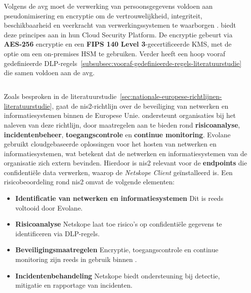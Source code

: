 Volgens de \gls{avg} moet de verwerking van persoonsgegevens voldoen aan pseudonimisering en encryptie om de vertrouwelijkheid, 
integriteit, beschikbaarheid en veerkracht van verwerkingssystemen te waarborgen \autocite{ICSA2018}.
\textcite{Netskope2025Encryption, Netskope2022Encryption} biedt deze principes aan in hun Cloud Security Platform.
De encryptie gebeurt via \textbf{AES-256} encryptie en een \textbf{FIPS 140 Level 3}-gecertificeerde KMS, met de optie om een on-premises HSM te gebruiken.
Verder heeft \textcite{Netskope2023GDPR} een hoop vooraf gedefinieerde DLP-regels~\ref{subsubsec:vooraf-gedefinieerde-regels-literatuurstudie} die samen voldoen aan de \gls{avg}.



\subsection{}
\label{sec:nis2_richtlijn}
Zoals besproken in de literatuurstudie~\ref{sec:nationale-europese-richtlijnen-literatuurstudie}, 
gaat de \gls{nis2}-richtlijn over de beveiliging van netwerken en informatiesystemen binnen de Europese Unie.
\textcite{Netskope2024NIS2} ondersteunt organisaties bij het naleven van deze richtlijn, 
door maatregelen aan te bieden rond \textbf{risicoanalyse}, \textbf{incidentenbeheer}, \textbf{toegangscontrole} en \textbf{continue monitoring}.
Evolane gebruikt cloudgebaseerde oplossingen voor het hosten van netwerken en informatiesystemen, wat betekent dat de netwerken en informatiesystemen van de organisatie zich extern bevinden.
Hierdoor is \gls{nis2} relevant voor de \textbf{endpoints} die confidentiële data verwerken, waarop de \textit{Netskope Client} geïnstalleerd is.
Een risicobeoordeling rond \gls{nis2} omvat de volgende elementen:

\begin{itemize}
    \item \textbf{Identificatie van netwerken en informatiesystemen} Dit is reeds voltooid door Evolane.
    \item \textbf{Risicoanalyse} Netskope laat toe risico's op confidentiële gegevens te identificeren via DLP-regels.
    \item \textbf{Beveiligingsmaatregelen} Encryptie, toegangscontrole en continue monitoring zijn reeds in gebruik binnen \textcite{Netskope2025Encryption, Netskope2022Encryption}.
    \item \textbf{Incidentenbehandeling} Netskope biedt ondersteuning bij detectie, mitigatie en rapportage van incidenten.
\end{itemize}

